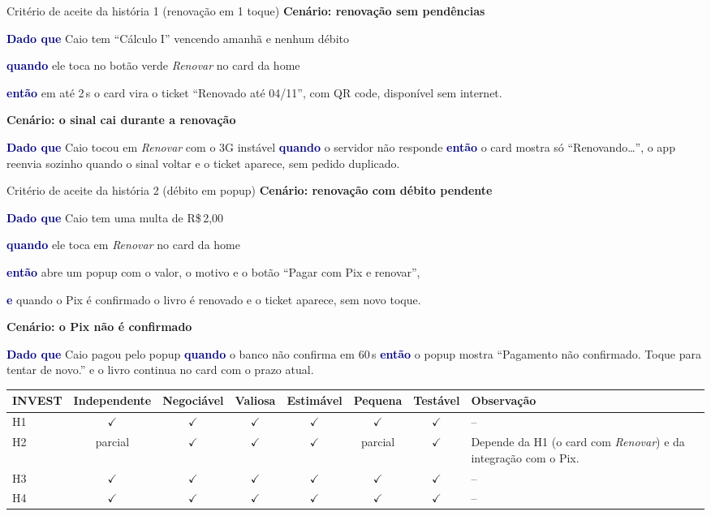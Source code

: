 \documentclass[10pt,a4paper]{article}
\newcommand{\gk}[1]{\textcolor{navy}{\bfseries #1}}
\begin{document}
\begin{caixa}[laranja]{Critério de aceite da história 1 \normalfont(renovação em 1 toque)}
\textbf{Cenário: renovação sem pendências}\par
\gk{Dado que} Caio tem ``Cálculo I'' vencendo amanhã e nenhum débito\par
\gk{quando} ele toca no botão verde \textit{Renovar} no card da home\par
\gk{então} em até 2\,s o card vira o ticket ``Renovado até 04/11'', com QR code, disponível sem internet.\par\vspace{3pt}
\textbf{Cenário: o sinal cai durante a renovação}\par
\gk{Dado que} Caio tocou em \textit{Renovar} com o 3G instável \gk{quando} o servidor não responde \gk{então} o card mostra só ``Renovando\ldots'', o app reenvia sozinho quando o sinal voltar e o ticket aparece, sem pedido duplicado.
\end{caixa}

\begin{caixa}[laranja]{Critério de aceite da história 2 \normalfont(débito em popup)}
\textbf{Cenário: renovação com débito pendente}\par
\gk{Dado que} Caio tem uma multa de R\$\,2,00\par
\gk{quando} ele toca em \textit{Renovar} no card da home\par
\gk{então} abre um popup com o valor, o motivo e o botão ``Pagar com Pix e renovar'',\par
\gk{e} quando o Pix é confirmado o livro é renovado e o ticket aparece, sem novo toque.\par\vspace{3pt}
\textbf{Cenário: o Pix não é confirmado}\par
\gk{Dado que} Caio pagou pelo popup \gk{quando} o banco não confirma em 60\,s \gk{então} o popup mostra ``Pagamento não confirmado. Toque para tentar de novo.'' e o livro continua no card com o prazo atual.
\end{caixa}

{\footnotesize\renewcommand{\arraystretch}{1.2}%
\noindent
\begin{tabularx}{\linewidth}{|l|c|c|c|c|c|c|X|}
\hline
\rowcolor{secbg}\bfseries INVEST & \bfseries Independente & \bfseries Negociável & \bfseries Valiosa & \bfseries Estimável & \bfseries Pequena & \bfseries Testável & \bfseries Observação \\ \hline
H1 & $\checkmark$ & $\checkmark$ & $\checkmark$ & $\checkmark$ & $\checkmark$ & $\checkmark$ & -- \\ \hline
H2 & parcial & $\checkmark$ & $\checkmark$ & $\checkmark$ & parcial & $\checkmark$ & Depende da H1 (o card com \textit{Renovar}) e da integração com o Pix. \\ \hline
H3 & $\checkmark$ & $\checkmark$ & $\checkmark$ & $\checkmark$ & $\checkmark$ & $\checkmark$ & -- \\ \hline
H4 & $\checkmark$ & $\checkmark$ & $\checkmark$ & $\checkmark$ & $\checkmark$ & $\checkmark$ & -- \\ \hline
\end{tabularx}\par}
\end{document}
